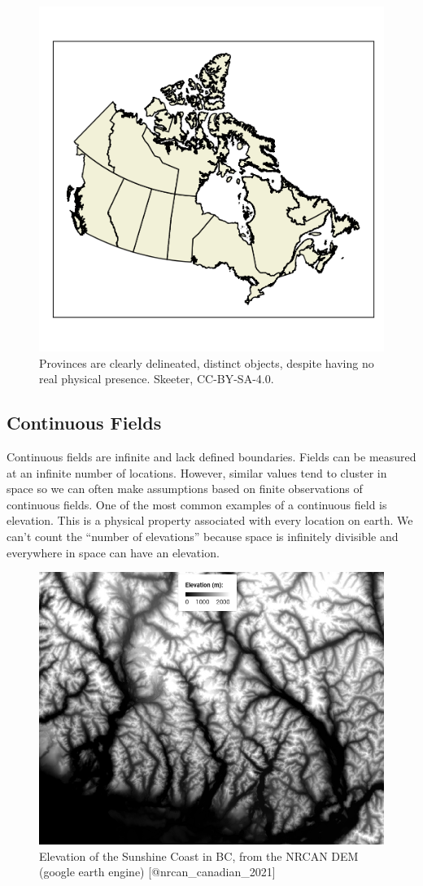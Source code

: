 \documentclass[
]{book}
\begin{document}
\begin{figure}
\includegraphics[width=0.75\linewidth]{images/03-vector} \caption{Provinces are clearly delineated, distinct objects, despite having no real physical presence. Skeeter, CC-BY-SA-4.0.}\label{fig:3-vector}
\end{figure}

\subsection{Continuous Fields}\label{continuous-fields}

Continuous fields are infinite and lack defined boundaries. Fields can be measured at an infinite number of locations. However, similar values tend to cluster in space so we can often make assumptions based on finite observations of continuous fields. One of the most common examples of a continuous field is elevation. This is a physical property associated with every location on earth. We can't count the ``number of elevations'' because space is infinitely divisible and everywhere in space can have an elevation.

\begin{figure}
\includegraphics[width=0.75\linewidth]{images/03-elevation} \caption{Elevation of the Sunshine Coast in BC, from the NRCAN DEM (google earth engine) [@nrcan_canadian_2021]}\label{fig:3-elevation}
\end{figure}
\end{document}

